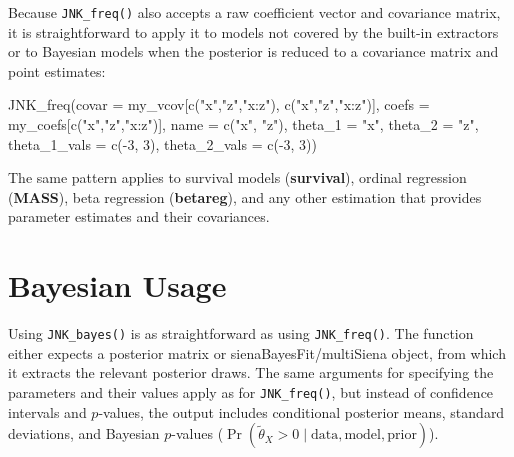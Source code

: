 \documentclass[
  letterpaper,
  DIV=11,
  numbers=noendperiod]{scrartcl}
\newenvironment{Shaded}{\begin{snugshade}}{\end{snugshade}}
\newcommand{\AttributeTok}[1]{\textcolor[rgb]{0.40,0.45,0.13}{#1}}
\newcommand{\DecValTok}[1]{\textcolor[rgb]{0.68,0.00,0.00}{#1}}
\newcommand{\FunctionTok}[1]{\textcolor[rgb]{0.28,0.35,0.67}{#1}}
\newcommand{\NormalTok}[1]{\textcolor[rgb]{0.00,0.23,0.31}{#1}}
\newcommand{\SpecialCharTok}[1]{\textcolor[rgb]{0.37,0.37,0.37}{#1}}
\newcommand{\StringTok}[1]{\textcolor[rgb]{0.13,0.47,0.30}{#1}}
\begin{document}
Because \texttt{JNK\_freq()} also accepts a raw coefficient vector and
covariance matrix, it is straightforward to apply it to models not
covered by the built-in extractors or to Bayesian models when the
posterior is reduced to a covariance matrix and point estimates:

\begin{Shaded}
\begin{Highlighting}[]
\FunctionTok{JNK\_freq}\NormalTok{(}\AttributeTok{covar =}\NormalTok{ my\_vcov[}\FunctionTok{c}\NormalTok{(}\StringTok{"x"}\NormalTok{,}\StringTok{"z"}\NormalTok{,}\StringTok{"x:z"}\NormalTok{), }\FunctionTok{c}\NormalTok{(}\StringTok{"x"}\NormalTok{,}\StringTok{"z"}\NormalTok{,}\StringTok{"x:z"}\NormalTok{)],}
         \AttributeTok{coefs =}\NormalTok{ my\_coefs[}\FunctionTok{c}\NormalTok{(}\StringTok{"x"}\NormalTok{,}\StringTok{"z"}\NormalTok{,}\StringTok{"x:z"}\NormalTok{)],}
         \AttributeTok{name  =} \FunctionTok{c}\NormalTok{(}\StringTok{"x"}\NormalTok{, }\StringTok{"z"}\NormalTok{),}
         \AttributeTok{theta\_1 =} \StringTok{"x"}\NormalTok{, }\AttributeTok{theta\_2 =} \StringTok{"z"}\NormalTok{,}
         \AttributeTok{theta\_1\_vals =} \FunctionTok{c}\NormalTok{(}\SpecialCharTok{{-}}\DecValTok{3}\NormalTok{, }\DecValTok{3}\NormalTok{),}
         \AttributeTok{theta\_2\_vals =} \FunctionTok{c}\NormalTok{(}\SpecialCharTok{{-}}\DecValTok{3}\NormalTok{, }\DecValTok{3}\NormalTok{))}
\end{Highlighting}
\end{Shaded}

The same pattern applies to survival models (\textbf{survival}), ordinal
regression (\textbf{MASS}), beta regression (\textbf{betareg}), and any
other estimation that provides parameter estimates and their
covariances.

\section{Bayesian Usage}\label{sec-bayes}

Using \texttt{JNK\_bayes()} is as straightforward as using
\texttt{JNK\_freq()}. The function either expects a posterior matrix or
sienaBayesFit/multiSiena object, from which it extracts the relevant
posterior draws. The same arguments for specifying the parameters and
their values apply as for \texttt{JNK\_freq()}, but instead of
confidence intervals and \(p\)-values, the output includes conditional
posterior means, standard deviations, and Bayesian \(p\)-values
(\(\Pr(\tilde{\theta}_X > 0 \mid \text{data}, \text{model}, \text{prior})\)).
\end{document}
